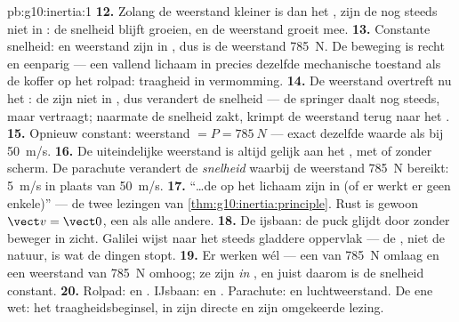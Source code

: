 \begin{solution}{pb:g10:inertia:1}
\textbf{12.} Zolang de weerstand kleiner is dan het , zijn de
 nog steeds niet in : de snelheid blijft groeien, en de
weerstand groeit mee.
\textbf{13.} Constante snelheid:  en weerstand zijn in ,
dus is de weerstand \qty{785}{N}. De beweging is recht en eenparig ---
een vallend lichaam in precies dezelfde mechanische toestand als de
koffer op het rolpad: traagheid in vermomming.
\textbf{14.} De weerstand overtreft nu het : de  zijn niet
in , dus verandert de snelheid --- de springer daalt nog steeds,
maar vertraagt; naarmate de snelheid zakt, krimpt de weerstand terug naar
het .
\textbf{15.} Opnieuw constant: weerstand $= P = \qty{785}{N}$ --- exact
dezelfde waarde als bij \qty{50}{m/s}.
\textbf{16.} De uiteindelijke weerstand is altijd gelijk aan het
, met of zonder scherm. De parachute verandert de \emph{snelheid}
waarbij de weerstand \qty{785}{N} bereikt: \qty{5}{m/s} in plaats van
\qty{50}{m/s}.
\textbf{17.} ``\dots de  op het lichaam zijn in  (of er
werkt er geen enkele)'' --- de twee lezingen van
\cref{thm:g10:inertia:principle}. Rust is gewoon $\vect v = \vect 0$,
een  als alle andere.
\textbf{18.} De ijsbaan: de puck glijdt door zonder beweger in zicht.
Galilei wijst naar het steeds gladdere oppervlak --- de , niet
de natuur, is wat de dingen stopt.
\textbf{19.} Er werken wél  --- een  van \qty{785}{N}
omlaag en een weerstand van \qty{785}{N} omhoog; ze zijn \emph{in
}, en juist daarom is de snelheid constant.
\textbf{20.} Rolpad:  en . IJsbaan:  en
. Parachute:  en luchtweerstand. De ene wet: het
traagheidsbeginsel, in zijn directe en zijn omgekeerde lezing.
\end{solution}
